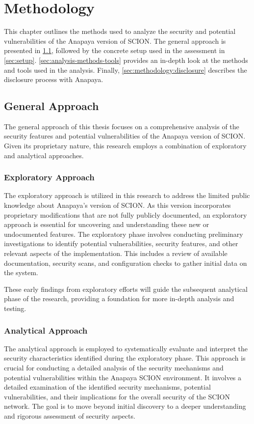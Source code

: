 \chapter{Methodology}
\label{ch:methodology}

This chapter outlines the methods used to analyze the security and potential vulnerabilities of the Anapaya version of SCION.
The general approach is presented in \cref{sec:general-approach}, followed by the concrete setup used in the assessment in \cref{sec:setup}.
\cref{sec:analysis-methods-tools} provides an in-depth look at the methods and tools used in the analysis.
Finally, \cref{sec:methodology:disclosure} describes the disclosure process with Anapaya.


\section{General Approach}
\label{sec:general-approach}
The general approach of this thesis focuses on a comprehensive analysis of the security features and potential vulnerabilities of the Anapaya version of SCION.
Given its proprietary nature, this research employs a combination of exploratory and analytical approaches.

\subsection{Exploratory Approach}
The exploratory approach is utilized in this research to address the limited public knowledge about Anapaya's version of SCION.
As this version incorporates proprietary modifications that are not fully publicly documented, an exploratory approach is essential for uncovering and understanding these new or undocumented features.
The exploratory phase involves conducting preliminary investigations to identify potential vulnerabilities, security features, and other relevant aspects of the implementation.
This includes a review of available documentation, security scans, and configuration checks to gather initial data on the system.

These early findings from exploratory efforts will guide the subsequent analytical phase of the research, providing a foundation for more in-depth analysis and testing.

\subsection{Analytical Approach}
The analytical approach is employed to systematically evaluate and interpret the security characteristics identified during the exploratory phase.
This approach is crucial for conducting a detailed analysis of the security mechanisms and potential vulnerabilities within the Anapaya SCION environment.
It involves a detailed examination of the identified security mechanisms, potential vulnerabilities, and their implications for the overall security of the SCION network.
The goal is to move beyond initial discovery to a deeper understanding and rigorous assessment of security aspects.


